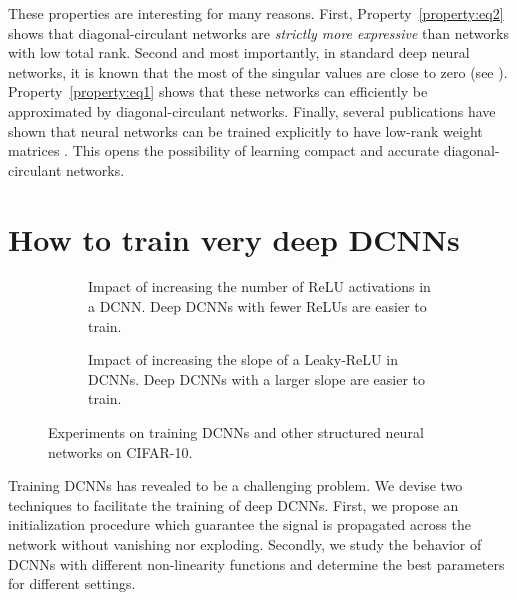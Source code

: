 These properties are interesting for many reasons. 
First, Property~\ref{property:eq2} shows that diagonal-circulant networks are \emph{strictly more expressive} than networks with low total rank. 
Second and most importantly, in standard deep neural networks, it is known that the most of the singular values are close to zero (see \eg \citet{sedghi2018iclr,Arora19neurips}).
Property~\ref{property:eq1} shows that these networks can efficiently be approximated by diagonal-circulant networks.
Finally, several publications have shown that neural networks can be trained explicitly to have low-rank weight matrices \cite{chong18eccv, goyal19}.
This opens the possibility of learning compact and accurate diagonal-circulant networks.



\section{How to train very deep DCNNs}
\label{section:training}

\begin{figure}
   \centering
   \begin{subfigure}[b]{0.49\textwidth}
       \centering
       
       \caption{
	Impact of increasing the number of ReLU activations in a DCNN.
	Deep DCNNs with fewer ReLUs are easier to train.}
       \label{figure:cifar10_factor}
   \end{subfigure}
   \hfill
   \begin{subfigure}[b]{0.49\textwidth}
       \centering
       
       \caption{
        Impact of increasing the slope of a Leaky-ReLU in DCNNs.
        Deep DCNNs with a larger slope are easier to train.}
       \label{figure:cifar10_leaky_relu}
   \end{subfigure}
   \caption{Experiments on training DCNNs and other structured neural networks on CIFAR-10.}
\end{figure}


Training DCNNs has revealed to be a challenging problem.
We devise two techniques to facilitate the training of deep DCNNs.
First, we propose an initialization procedure which guarantee the signal is propagated across the network without vanishing nor exploding.
Secondly, we study the behavior of DCNNs with different non-linearity functions and determine the best parameters for different settings. 

